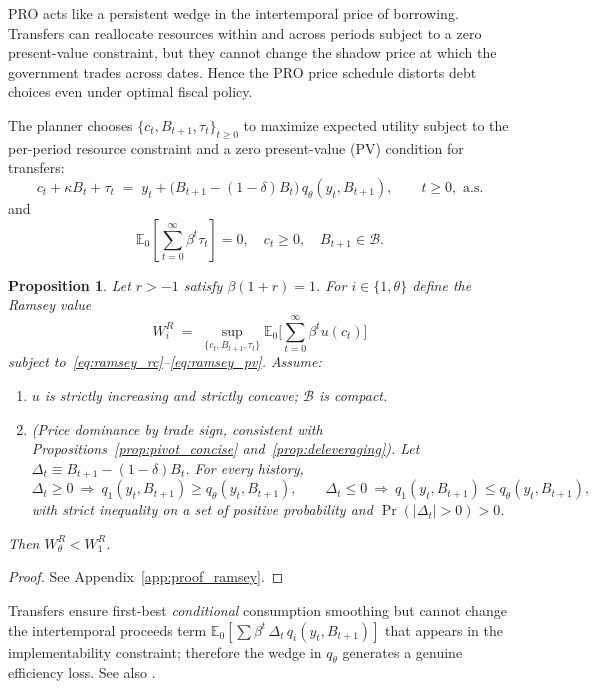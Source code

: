 \documentclass[12pt]{article}
\theoremstyle{plain}
\newtheorem{proposition}{Proposition}
\newcommand{\E}{\mathbb{E}}
\begin{document}
PRO acts like a persistent wedge in the intertemporal price of borrowing.
Transfers can reallocate resources within and across periods subject to a zero
present-value constraint, but they cannot change the shadow price at which the
government trades across dates. Hence the PRO price schedule distorts debt
choices even under optimal fiscal policy.

The planner chooses $\{c_t,B_{t+1},\tau_t\}_{t\ge0}$ to maximize expected
utility subject to the per-period resource constraint and a zero present-value
(PV) condition for transfers:
\begin{equation}
	c_t+\kappa B_t+\tau_t \;=\; y_t+\bigl(B_{t+1}-(1-\delta)B_t\bigr)\,q_\theta(y_t,B_{t+1}),
	\qquad t\ge0, \text{ a.s.}
	\label{eq:ramsey_rc}
\end{equation}
and
\begin{equation}
	\E_0\!\left[\sum_{t=0}^\infty \beta^t \tau_t\right]=0,
	\quad c_t\ge0,
	\quad B_{t+1}\in\mathcal B.
	\label{eq:ramsey_pv}
\end{equation}

\begin{proposition}
	\label{prop:ramsey_welfare}
	Let $r>-1$ satisfy $\beta(1+r)=1$. For $i\in\{1,\theta\}$ define the Ramsey value
	\[
		W^R_i \;=\; \sup_{\{c_t,B_{t+1},\tau_t\}}\E_0\!\Big[\sum_{t=0}^\infty \beta^t u(c_t)\Big]
	\]
	subject to~\eqref{eq:ramsey_rc}--\eqref{eq:ramsey_pv}. Assume:
	\begin{enumerate}
		\item[(A1)] $u$ is strictly increasing and strictly concave; $\mathcal B$ is compact.
		\item[(A2)] (Price dominance by trade sign, consistent with Propositions~\ref{prop:pivot_concise} and~\ref{prop:deleveraging}). Let $\Delta_t\equiv B_{t+1}-(1-\delta)B_t$. For every history,
		      \[
			      \Delta_t\ge0 \ \Rightarrow\ q_1(y_t,B_{t+1})\ge q_\theta(y_t,B_{t+1}),\qquad
			      \Delta_t\le0 \ \Rightarrow\ q_1(y_t,B_{t+1})\le q_\theta(y_t,B_{t+1}),
		      \]
		      with strict inequality on a set of positive probability and
		      $\Pr(|\Delta_t|>0)>0$.
	\end{enumerate}
	Then $W^R_\theta<W^R_1$.
\end{proposition}

\begin{proof}
	See Appendix~\ref{app:proof_ramsey}.
\end{proof}

Transfers ensure first-best \emph{conditional} consumption smoothing but cannot
change the intertemporal proceeds term $\E_0[\sum
	\beta^t\,\Delta_t\,q_i(y_t,B_{t+1})]$ that appears in the implementability
constraint; therefore the wedge in $q_\theta$ generates a genuine efficiency
loss. See also \citet{AiyagariMarcetSargentSeppala2002}.
\end{document}
